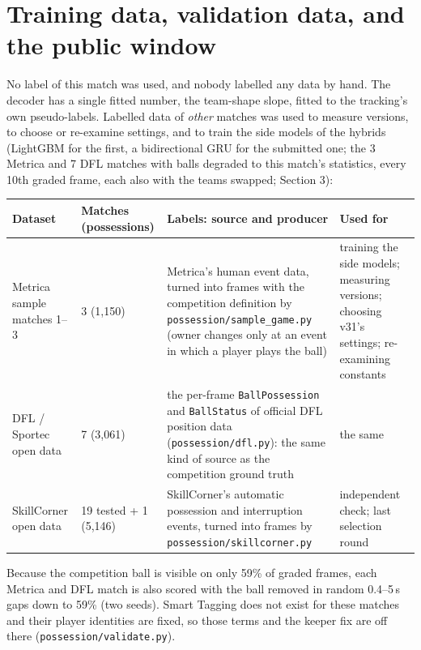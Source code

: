 \documentclass[11pt,a4paper]{article}
\newcommand{\code}[1]{\texttt{#1}}
\newcommand{\st}[1]{\textbf{#1}}
\begin{document}
\section{Training data, validation data, and the public window}

No label of this match was used, and nobody labelled any data by hand. The decoder has a single fitted number,
the team-shape slope, fitted to the tracking's own pseudo-labels. Labelled data of \emph{other}
matches was used to measure versions, to choose or re-examine settings, and to train the side
models of the hybrids (LightGBM for the first, a bidirectional GRU for the submitted one; the 3 Metrica and 7 DFL matches with balls degraded to
this match's statistics, every 10th graded frame, each also with the teams swapped; Section 3):

\begin{center}\small
\begin{tabularx}{\linewidth}{@{}P{2.75cm} P{1.75cm} L P{3.3cm}@{}}
\toprule
\st{Dataset} & \st{Matches (possessions)} & \st{Labels: source and producer} & \st{Used for} \\
\midrule
Metrica sample matches 1--3 & 3 (1,150) &
Metrica's human event data, turned into frames with the competition definition by
\code{possession/sample\_game.py} (owner changes only at an event in which a player plays the ball) &
training the side models; measuring versions; choosing v31's settings; re-examining constants \\
DFL / Sportec open data & 7 (3,061) &
the per-frame \code{BallPossession} and \code{BallStatus} of official DFL position data
(\code{possession/dfl.py}): the same kind of source as the competition ground truth & the same \\
SkillCorner open data & 19 tested + 1 (5,146) &
SkillCorner's automatic possession and interruption events, turned into frames by
\code{possession/skillcorner.py} & independent check; last selection round \\
\bottomrule
\end{tabularx}
\end{center}

Because the competition ball is visible on only 59\% of graded frames, each Metrica and DFL match is
also scored with the ball removed in random 0.4--5\,s gaps down to 59\% (two seeds). Smart Tagging
does not exist for these matches and their player identities are fixed, so those terms and the keeper
fix are off there (\code{possession/validate.py}).
\end{document}
